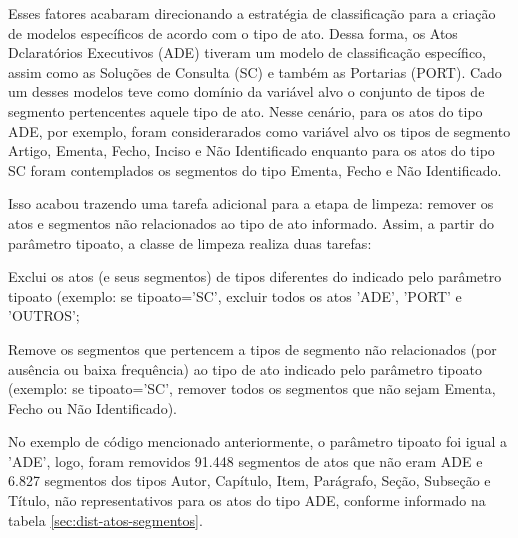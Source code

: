 Esses fatores acabaram direcionando a estratégia de classificação para a criação de modelos específicos de acordo com o tipo de ato. Dessa forma, os Atos Dclaratórios Executivos (ADE) tiveram um modelo de classificação específico, assim como as Soluções de Consulta (SC) e também as Portarias (PORT). Cado um desses modelos teve como domínio da variável alvo o conjunto de tipos de segmento pertencentes aquele tipo de ato. Nesse cenário, para os atos do tipo ADE, por exemplo, foram considerarados como variável alvo os tipos de segmento Artigo, Ementa, Fecho, Inciso e Não Identificado enquanto para os atos do tipo SC foram contemplados os segmentos do tipo Ementa, Fecho e Não Identificado. 

Isso acabou trazendo uma tarefa adicional para a etapa de limpeza: remover os atos e segmentos não relacionados ao tipo de ato informado. Assim, a partir do parâmetro tipo\textunderscore ato, a classe de limpeza realiza duas tarefas: 
\begin{alineas}
	\item Exclui os atos (e seus segmentos) de tipos diferentes do indicado pelo parâmetro tipo\textunderscore ato (exemplo: se tipo\textunderscore ato='SC', excluir todos os atos 'ADE', 'PORT' e 'OUTROS';
	\item Remove os segmentos que pertencem a tipos de segmento não relacionados (por ausência ou baixa frequência) ao tipo de ato indicado pelo parâmetro tipo\textunderscore ato (exemplo: se tipo\textunderscore ato='SC', remover todos os segmentos que não sejam Ementa, Fecho ou Não Identificado).
\end{alineas}

No exemplo de código mencionado anteriormente, o parâmetro tipo\textunderscore ato foi igual a 'ADE', logo, foram removidos 91.448 segmentos de atos que não eram ADE e 6.827 segmentos dos tipos Autor, Capítulo, Item, Parágrafo, Seção, Subseção e Título, não representativos para os atos do tipo ADE, conforme informado na tabela \ref{sec:dist-atos-segmentos}. 